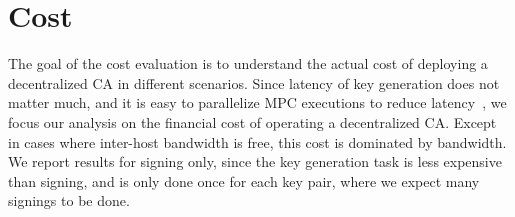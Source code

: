 \section{Cost}\label{sec:performance}


The goal of the cost evaluation is to understand the actual cost of deploying a decentralized CA in different scenarios.  Since latency of key generation does not matter much, and it is easy to parallelize MPC executions to reduce latency~\cite{husted2013gpu,buescher2015faster}, we focus our analysis on the financial cost of operating a decentralized CA.  Except in cases where inter-host bandwidth is free, this cost is dominated by bandwidth.
We report results for signing only, since the key generation task is less expensive than signing, and is only done once for each key pair, where we expect many signings to be done.

